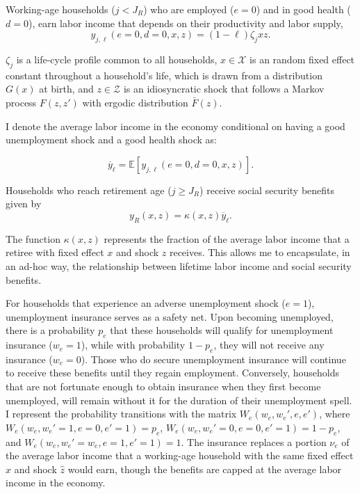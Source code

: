 \documentclass[parskip=full]{article}
\begin{document}
Working-age households ($j<J_R$) who are employed ($e=0$) and in good health ($d=0$), earn labor income that depends on their productivity and labor supply,
\begin{equation}
y_{j,\ell}(e=0,d=0,x,z) = (1-\ell) \zeta_j x z.
\end{equation}

\noindent $\zeta_j$ is a life-cycle profile common to all households, $x\in \mathcal{X}$ is an random fixed effect constant throughout a household's life, which is drawn from a distribution $G(x)$ at birth, and $z\in \mathcal{Z}$ is an idiosyncratic shock that follows a Markov process $F(z,z')$ with ergodic distribution $\bar{F}(z)$.

I denote the average labor income in the economy conditional on having a good unemployment shock and a good health shock as: 

\begin{equation}
    \overline{y}_{\ell}=\mathbb{E}[y_{j,\ell}(e=0,d=0,x,z)].
\end{equation} 

\noindent Households who reach retirement age ($j\geq J_R$) receive social security benefits given by
\begin{equation}
    y_R(x,z) = \kappa(x,z) \overline{y}_{\ell}.
\end{equation}

\noindent The function $\kappa(x,z)$ represents the fraction of the average labor income that a retiree with fixed effect $x$ and shock $z$ receives. This allows me to encapsulate, in an ad-hoc way, the relationship between lifetime labor income and social security benefits. 

For households that experience an adverse unemployment shock ($e=1$), unemployment insurance serves as a safety net. Upon becoming unemployed, there is a probability $p_{e}$ that these households will qualify for unemployment insurance ($w_{e}=1$), while with probability $1-p_{e}$, they will not receive any insurance ($w_{e}=0$). Those who do secure unemployment insurance will continue to receive these benefits until they regain employment. Conversely, households that are not fortunate enough to obtain insurance when they first become unemployed, will remain without it for the duration of their unemployment spell. I represent the probability transitions with the matrix $W_{e}(w_{e},w_{e}',e,e')$, where $W_{e}(w_{e},w_{e}'=1,e=0,e'=1)=p_{e}$, $W_{e}(w_{e},w_{e}'=0,e=0,e'=1)=1-p_{e}$, and $W_{e}(w_{e},w_{e}'=w_{e},e=1,e'=1)=1$. The insurance replaces a portion $\nu_{e}$ of the average labor income that a working-age household with the same fixed effect $\hat{x}$ and shock $\hat{z}$ would earn, though the benefits are capped at the average labor income in the economy.
\end{document}
